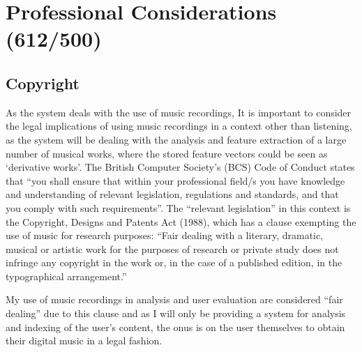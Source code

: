\section{Professional Considerations (612/500)}
\label{text:spec:profcons}

\subsection{Copyright}
As the system deals with the use of music recordings, 
It is important to consider the legal implications of using music recordings in a context other than listening, as the system will be dealing with the analysis and feature extraction of a large number of musical works, where the stored feature vectors could be seen as `derivative works'. The British Computer Society's (BCS) Code of Conduct states that ``you shall ensure that within your professional field/s you have knowledge and understanding of relevant legislation, regulations and standards, and that you comply with such requirements''. The ``relevant legislation'' in this context is the Copyright, Designs and Patents Act (1988), which has a clause exempting the use of music for research purposes: ``Fair dealing with a literary, dramatic, musical or artistic work for the purposes of research or private study does not infringe any copyright in the work or, in the case of a published edition, in the typographical arrangement.''

My use of music recordings in analysis and user evaluation are considered ``fair dealing'' due to this clause and as I
will only be providing a system for analysis and indexing of the user's content,
the onus is on the user themselves to obtain their digital music in a legal fashion.

